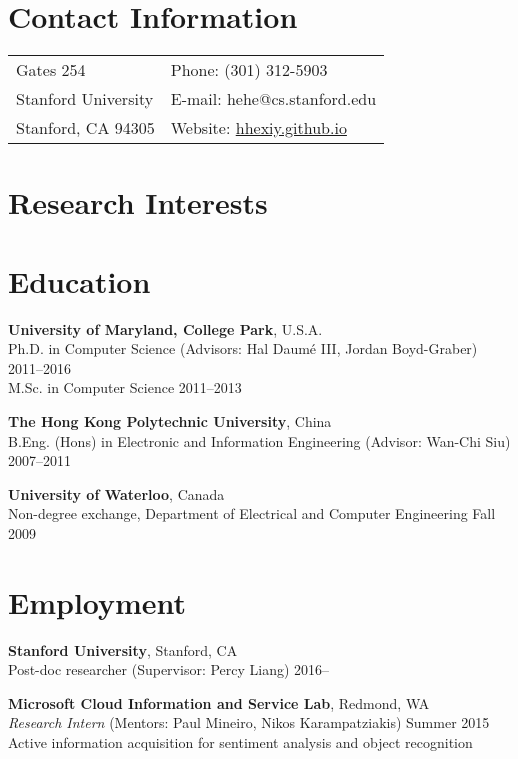 \documentclass[margin,line]{resume}
\begin{document}

\begin{resume}
\section{\sc Contact Information}
\vspace{.05in}
\begin{tabular}{@{}p{2.5in}p{4in}}
Gates 254             & Phone: (301) 312-5903 \\            
Stanford University   & E-mail: hehe@cs.stanford.edu \\         
Stanford, CA 94305    & Website: \url{hhexiy.github.io}\\        
\end{tabular}

\section{\sc Research Interests}

\section{\sc Education}
{\bf University of Maryland, College Park}, U.S.A.\\
Ph.D. in Computer Science (Advisors: Hal Daum\'e III, Jordan Boyd-Graber) \hfill 2011--2016\\
M.Sc. in Computer Science \hfill 2011--2013

{\bf The Hong Kong Polytechnic University}, China\\ 
B.Eng. (Hons) in Electronic and Information Engineering (Advisor: Wan-Chi Siu) \hfill 2007--2011

{\bf University of Waterloo}, Canada\\
Non-degree exchange, Department of Electrical and Computer Engineering \hfill Fall 2009

\section{\sc Employment}
{\bf Stanford University}, Stanford, CA\\
Post-doc researcher (Supervisor: Percy Liang) \hfill 2016--

{\bf Microsoft Cloud Information and Service Lab}, Redmond, WA\\
\emph{Research Intern} (Mentors: Paul Mineiro, Nikos Karampatziakis) \hfill Summer 2015\\
Active information acquisition for sentiment analysis and object recognition 


\end{resume}
\end{document}
